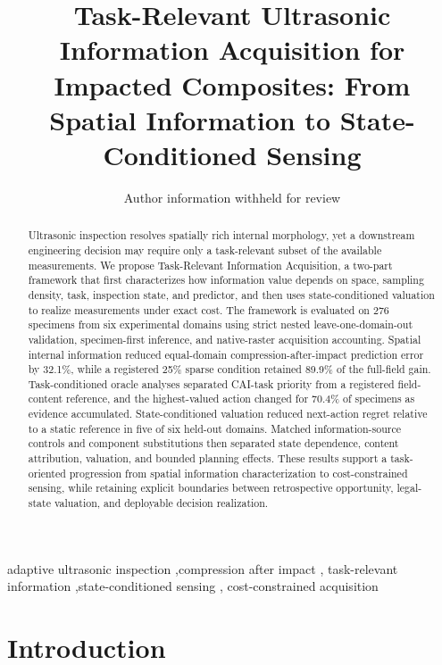 \documentclass[preprint,12pt]{elsarticle}
\begin{document}
\begin{frontmatter}

\title{Task-Relevant Ultrasonic Information Acquisition for Impacted Composites: From Spatial Information to State-Conditioned Sensing}

\author{Author information withheld for review}
\address{Author affiliation withheld for review}

\begin{abstract}
Ultrasonic inspection resolves spatially rich internal morphology, yet a
downstream engineering decision may require only a task-relevant subset of the
available measurements. We propose Task-Relevant Information Acquisition, a
two-part framework that first characterizes how information value depends on
space, sampling density, task, inspection state, and predictor, and then uses
state-conditioned valuation to realize measurements under exact cost. The
framework is evaluated on 276 specimens from six experimental domains using
strict nested leave-one-domain-out validation, specimen-first inference, and
native-raster acquisition accounting. Spatial internal information reduced
equal-domain compression-after-impact prediction error by 32.1\%, while a
registered 25\% sparse condition retained 89.9\% of the full-field gain.
Task-conditioned oracle analyses separated CAI-task priority from a registered
field-content reference, and the highest-valued action changed for 70.4\%
of specimens as evidence accumulated. State-conditioned valuation reduced
next-action regret relative to a static reference in five of six held-out
domains. Matched information-source controls and component substitutions then
separated state dependence, content attribution, valuation, and bounded
planning effects. These results support a task-oriented progression from
spatial information characterization to cost-constrained sensing, while
retaining explicit boundaries between retrospective opportunity, legal-state
valuation, and deployable decision realization.
\end{abstract}

\begin{keyword}
adaptive ultrasonic inspection \sep compression after impact \sep
task-relevant information \sep state-conditioned sensing \sep
cost-constrained acquisition
\end{keyword}

\end{frontmatter}

\section{Introduction}
\label{sec:introduction}
\end{document}

